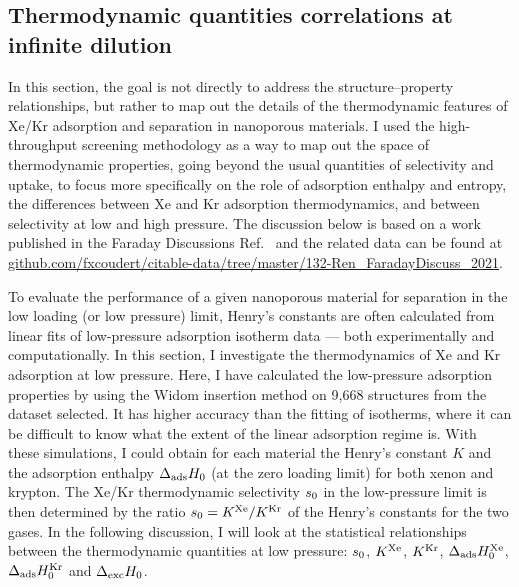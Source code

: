 \documentclass[main.tex]{subfiles}
\begin{document}
\subsection{Thermodynamic quantities correlations at infinite dilution}

In this section, the goal is not directly to address the structure--property relationships, but rather to map out the details of the thermodynamic features of Xe/Kr adsorption and separation in nanoporous materials. I used the high-throughput screening methodology as a way to map out the space of thermodynamic properties, going beyond the usual quantities of selectivity and uptake, to focus more specifically on the role of adsorption enthalpy and entropy, the differences between Xe and Kr adsorption thermodynamics, and between selectivity at low and high pressure. The discussion below is based on a work published in the Faraday Discussions Ref.~\cite{Ren_2021} and the related data can be found at \url{github.com/fxcoudert/citable-data/tree/master/132-Ren_FaradayDiscuss_2021}.

To evaluate the performance of a given nanoporous material for separation in the low loading (or low pressure) limit, Henry's constants are often calculated from linear fits of low-pressure adsorption isotherm data --- both experimentally and computationally. In this section, I investigate the thermodynamics of Xe and Kr adsorption at low pressure. Here, I have calculated the low-pressure adsorption properties by using the Widom insertion method\autocite{Widom1963, frenkel2001widom} on 9,668 structures from the dataset selected. It has higher accuracy than the fitting of isotherms, where it can be difficult to know what the extent of the linear adsorption regime is. With these simulations, I could obtain for each material the Henry's constant $K$ and the adsorption enthalpy $\Delta_{\text{ads}}H_{\text{0}}$ (at the zero loading limit) for both xenon and krypton. The Xe/Kr thermodynamic selectivity $s_{\text{0}}$ in the low-pressure limit is then determined by the ratio $s_{\text{0}} = K^{\text{Xe}}/K^{\text{Kr}}$ of the Henry's constants for the two gases. In the following discussion, I will look at the statistical relationships between the thermodynamic quantities at low pressure: $s_{\text{0}}$, $K^{\text{Xe}}$, $K^{\text{Kr}}$, $\Delta_{\text{ads}}H_{\text{0}}^{\text{Xe}}$, $\Delta_{\text{ads}}H_{\text{0}}^{\text{Kr}}$ and $\Delta_{\text{exc}}H_{\text{0}}$.
\end{document}
